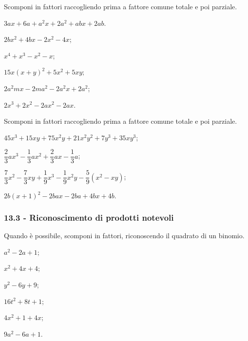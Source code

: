 \begin{esercizio}
\label{ese:13.21}
Scomponi in fattori raccogliendo prima a fattore comune totale e poi parziale.
\begin{multicols}{2}
\begin{enumeratea}
 \item $3ax+6a+a^{2}x+2a^{2}+abx+2ab$.
 \item $2bx^{2}+4bx-2x^{2}-4x$;
 \item $x^{4}+x^{3}-x^{2}-x$;
 \item $15x(x+y)^{2}+5x^{2}+5xy$;
 \item $2a^{2}mx-2ma^{2}-2a^{2}x+2a^{2}$;
 \item $2x^{3}+2x^{2}-2ax^{2}-2ax$.
\end{enumeratea}
\end{multicols}
\end{esercizio}

\begin{esercizio}[\Ast]
\label{ese:13.22}
Scomponi in fattori raccogliendo prima a fattore comune totale e poi parziale.
\begin{enumeratea}
 \item $45x^{3}+15xy+75x^{2}y+21x^{2}y^{2}+7y^{3}+35xy^{3}$;
 \item $\dfrac{2}{3}ax^{3}-\dfrac{1}{3}ax^{2}+\dfrac{2}{3}ax-\dfrac{1}{3}a$;
 \item $\dfrac{7}{3}x^{2}-\dfrac{7}{3}xy+\dfrac{1}{9}x^{3}-\dfrac{1}{9}x^{2}y-\dfrac{5}{9}(x^{2}-xy)$;
 \item $2b(x+1)^{2}-2bax-2ba+4bx+4b$.
\end{enumeratea}
\end{esercizio}

\subsubsection*{13.3 - Riconoscimento di prodotti notevoli}
\begin{esercizio}
\label{ese:13.23}
Quando è possibile, scomponi in fattori, riconoscendo il quadrato di un binomio.
\begin{multicols}{3}
\begin{enumeratea}
 \item $a^{2}-2a+1$;
 \item $x^{2}+4x+4$;
 \item $y^{2}-6y+9$;
 \item $16t^{2}+8t+1$;
 \item $4x^{2}+1+4x$;
 \item $9a^{2}-6a+1$.
\end{enumeratea}
\end{multicols}
\end{esercizio}

